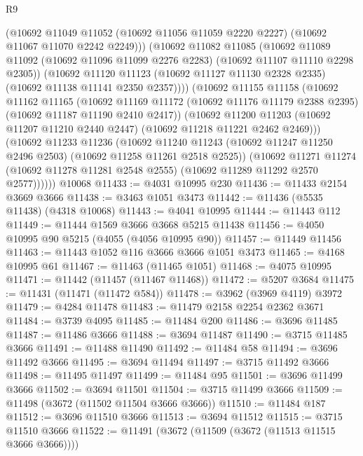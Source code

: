 \begin{lexlean}{R9}
\begin{coremodule}
            (@10692
              @11049
              @11052
              (@10692 @11056 @11059 @2220 @2227)
              (@10692 @11067 @11070 @2242 @2249)))
          (@10692
            @11082
            @11085
            (@10692
              @11089
              @11092
              (@10692 @11096 @11099 @2276 @2283)
              (@10692 @11107 @11110 @2298 @2305))
            (@10692
              @11120
              @11123
              (@10692 @11127 @11130 @2328 @2335)
              (@10692 @11138 @11141 @2350 @2357))))
        (@10692
          @11155
          @11158
          (@10692
            @11162
            @11165
            (@10692
              @11169
              @11172
              (@10692 @11176 @11179 @2388 @2395)
              (@10692 @11187 @11190 @2410 @2417))
            (@10692
              @11200
              @11203
              (@10692 @11207 @11210 @2440 @2447)
              (@10692 @11218 @11221 @2462 @2469)))
          (@10692
            @11233
            @11236
            (@10692
              @11240
              @11243
              (@10692 @11247 @11250 @2496 @2503)
              (@10692 @11258 @11261 @2518 @2525))
            (@10692
              @11271
              @11274
              (@10692 @11278 @11281 @2548 @2555)
              (@10692 @11289 @11292 @2570 @2577))))))
    @10068
@11433 := @4031 @10995 @230
@11436 := @11433 @2154 @3669 @3666
@11438 := @3463 @1051 @3473
@11442 := @11436 (@5535 @11438) (@4318 @10068)
@11443 := @4041 @10995
@11444 := @11443 @112
@11449 := @11444 @1569 @3666 @3668 @5215 @11438
@11456 := @4050 @10995 @90 @5215 (@4055 (@4056 @10995 @90))
@11457 := @11449 @11456
@11463 := @11443 @1052 @116 @3666 @3666 @1051 @3473
@11465 := @4168 @10995 @61
@11467 := @11463 (@11465 @1051)
@11468 := @4075 @10995
@11471 := @11442 (@11457 (@11467 @11468))
@11472 := @5207 @3684
@11475 := @11431 (@11471 (@11472 @584))
@11478 := @3962 (@3969 @4119) @3972
@11479 := @4284 @11478
@11483 := @11479 @2158 @2254 @2362 @3671
@11484 := @3739 @4095
@11485 := @11484 @200
@11486 := @3696 @11485
@11487 := @11486 @3666
@11488 := @3694 @11487
@11490 := @3715 @11485 @3666
@11491 := @11488 @11490
@11492 := @11484 @58
@11494 := @3696 @11492 @3666
@11495 := @3694 @11494
@11497 := @3715 @11492 @3666
@11498 := @11495 @11497
@11499 := @11484 @95
@11501 := @3696 @11499 @3666
@11502 := @3694 @11501
@11504 := @3715 @11499 @3666
@11509 := @11498 (@3672 (@11502 @11504 @3666 @3666))
@11510 := @11484 @187
@11512 := @3696 @11510 @3666
@11513 := @3694 @11512
@11515 := @3715 @11510 @3666
@11522 := @11491 (@3672 (@11509 (@3672 (@11513 @11515 @3666 @3666))))

\end{coremodule}
\end{lexlean}
